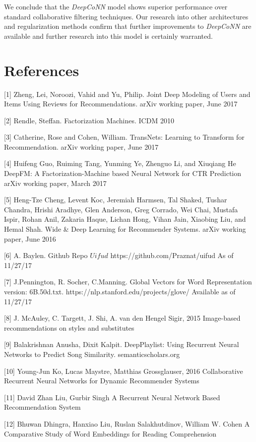 \documentclass[10pt, twocolumn, letterpaper]{article}
\begin{document}
We conclude that the \textit{DeepCoNN} model shows superior performance over standard collaborative filtering techniques. Our research into other architectures and regularization methods confirm that further improvements to \textit{DeepCoNN} are available and further research into this model is certainly warranted.


\section{References}

[1] Zheng, Lei, Noroozi, Vahid and Yu, Philip.
Joint Deep Modeling of Users and Items Using Reviews for Recommendations. arXiv working paper, June 2017

[2] Rendle, Steffan.
Factorization Machines. ICDM 2010

[3] Catherine, Rose and Cohen, William.
TransNets: Learning to Transform for Recommendation. arXiv working paper, June 2017

[4] Huifeng Guo, Ruiming Tang, Yunming Ye, Zhenguo Li, and Xiuqiang He
DeepFM: A Factorization-Machine based Neural Network for CTR Prediction
arXiv working paper, March 2017

[5] Heng-Tze Cheng, Levent Koc, Jeremiah Harmsen, Tal Shaked, Tushar Chandra, Hrishi Aradhye, Glen Anderson, Greg Corrado, Wei Chai, Mustafa Ispir, Rohan Anil, Zakaria Haque, Lichan Hong, Vihan Jain, Xiaobing Liu, and Hemal Shah.
Wide \& Deep Learning for Recommender Systems. arXiv working paper, June 2016

[6] A. Baylen. Github Repo $Uifud$
https://github.com/Praznat/uifud
As of 11/27/17

[7] J.Pennington, R. Socher, C.Manning.
Global Vectors for Word Representation version: 6B.50d.txt.
https://nlp.stanford.edu/projects/glove/
Available as of 11/27/17

[8] J. McAuley, C. Targett, J. Shi, A. van den Hengel Sigir, 2015
Image-based recommendations on styles and substitutes

[9] Balakrishnan Anusha, Dixit Kalpit.
DeepPlaylist: Using Recurrent Neural Networks to Predict Song Similarity. semanticscholars.org

[10] Young-Jun Ko, Lucas Maystre, Matthias Grossglauser, 2016
Collaborative Recurrent Neural Networks for Dynamic Recommender Systems

[11] David Zhan Liu, Gurbir Singh
A Recurrent Neural Network Based Recommendation System

[12] Bhuwan Dhingra, Hanxiao Liu, Ruslan Salakhutdinov, William W. Cohen
A Comparative Study of Word Embeddings for Reading Comprehension
\end{document}
